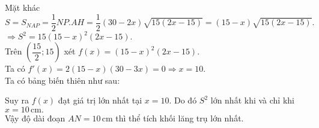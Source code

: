 \begin{vd}
{		Mặt khác $S=S_{NAP}=\dfrac{1}{2}NP.AH=\dfrac{1}{2}(30-2x)\sqrt{15(2x-15)} = (15-x) \sqrt{15(2x-15)}.$\\
		$\Rightarrow S^2=15(15-x)^2(2x-15).$ \\
		Trên $ \left(\dfrac{15}{2};15\right)$ xét  $ f(x) = (15-x)^2(2x-15) $. \\
		Ta có $ f'(x) = 2(15-x)(30-3x) = 0 \Rightarrow x = 10. $\\
		Ta có bảng biến thiên như sau:
	\begin{center}
	\end{center}	
		Suy ra $ f(x) $ đạt giá trị lớn nhất tại $ x = 10 $.
		Do đó $S^2$ lớn nhất khi và chỉ khi $x=10 \, \mathrm{cm}.$\\
		Vậy độ dài đoạn $ AN = 10 \, \mathrm{cm} $ thì thể tích khối lăng trụ lớn nhất.
	}
\end{vd}
